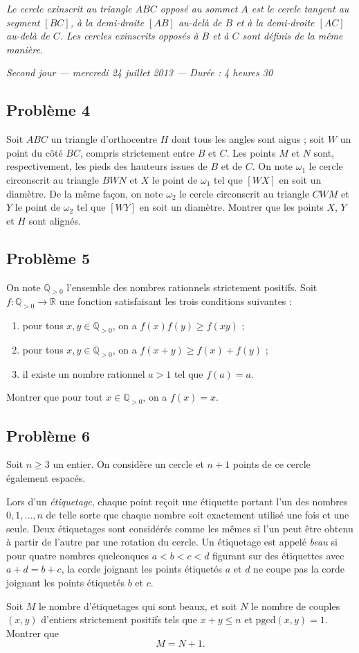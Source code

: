 \emph{Le cercle exinscrit au triangle $ABC$ opposé au sommet $A$ est le cercle tangent au segment $[BC]$, à la
demi-droite $[AB]$ au-delà de $B$ et à la demi-droite $[AC]$ au-delà de $C$. Les cercles exinscrits opposés à
$B$ et à $C$ sont définis de la même manière.}

\bigskip
\begin{center}
  \emph{Second jour --- mercredi 24 juillet 2013 --- Durée : 4 heures 30}
\end{center}

\subsection*{Problème 4}
Soit $ABC$ un triangle d'orthocentre $H$ dont tous les angles sont aigus ; soit $W$ un point du côté $BC$,
compris strictement entre $B$ et $C$. Les points $M$ et $N$ sont, respectivement, les pieds des hauteurs
issues de $B$ et de $C$. On note $\omega_1$ le cercle circonscrit au triangle $BWN$ et $X$ le point de
$\omega_1$ tel que $[WX]$ en soit un diamètre. De la même façon, on note $\omega_2$ le cercle circonscrit au
triangle $CWM$ et $Y$ le point de $\omega_2$ tel que $[WY]$ en soit un diamètre. Montrer que les points $X$,
$Y$ et $H$ sont alignés.

\subsection*{Problème 5}
On note $\mathbb{Q}_{>0}$ l'ensemble des nombres rationnels strictement positifs. Soit
$f : \mathbb{Q}_{>0} \to \mathbb{R}$ une fonction satisfaisant les trois conditions suivantes :
\begin{enumerate}
  \item[(i)] pour tous $x, y \in \mathbb{Q}_{>0}$, on a $f(x)f(y) \geq f(xy)$ ;
  \item[(ii)] pour tous $x, y \in \mathbb{Q}_{>0}$, on a $f(x + y) \geq f(x) + f(y)$ ;
  \item[(iii)] il existe un nombre rationnel $a > 1$ tel que $f(a) = a$.
\end{enumerate}
Montrer que pour tout $x \in \mathbb{Q}_{>0}$, on a $f(x) = x$.

\subsection*{Problème 6}
Soit $n \geq 3$ un entier. On considère un cercle et $n + 1$ points de ce cercle également espacés.

Lors d'un \emph{étiquetage}, chaque point reçoit une étiquette portant l'un des nombres $0, 1, \ldots, n$ de
telle sorte que chaque nombre soit exactement utilisé une fois et une seule. Deux étiquetages sont considérés
comme les mêmes si l'un peut être obtenu à partir de l'autre par une rotation du cercle. Un étiquetage est
appelé \emph{beau} si pour quatre nombres quelconques $a < b < c < d$ figurant sur des étiquettes avec
$a + d = b + c$, la corde joignant les points étiquetés $a$ et $d$ ne coupe pas la corde joignant les points
étiquetés $b$ et $c$.

Soit $M$ le nombre d'étiquetages qui sont beaux, et soit $N$ le nombre de couples $(x, y)$ d'entiers
strictement positifs tels que $x + y \leq n$ et $\mathrm{pgcd}(x, y) = 1$. Montrer que
\[
M = N + 1.
\]
